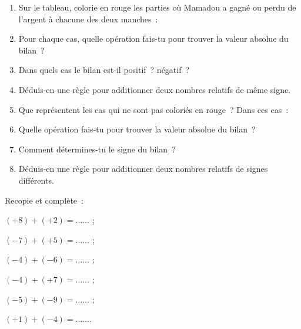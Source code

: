 \begin{activite}
\begin{partie}
\begin{enumerate}
 \item Sur le tableau, colorie en rouge les parties où Mamadou a gagné ou perdu de l'argent à chacune des deux manches :
 \item Pour chaque cas, quelle opération fais-tu pour trouver la valeur absolue du bilan ? 
 \item Dans quels cas le bilan est-il positif ? négatif ?
 \item Déduis-en une règle pour additionner deux nombres relatifs de même signe.
 \item Que représentent les cas qui ne sont pas coloriés en rouge ? Dans ces cas :
 \item Quelle opération fais-tu pour trouver la valeur absolue du bilan ? 
 \item Comment détermines-tu le signe du bilan ? 
 \item Déduis-en une règle pour additionner deux nombres relatifs de signes différents. 
 \end{enumerate}
\end{partie}

\begin{partie}
Recopie et complète :
\begin{colenumerate}{3}
 \item $(+8) + (+2) = \ldots \dots$ ;
 \item $(-7) + (+5) = \ldots \dots$ ;
 \item $(-4) + (-6) = \ldots \dots$ ;
 \item $(-4) + (+7) = \ldots \dots$ ;
 \item $(-5) + (-9) = \ldots \dots$ ;
 \item $(+1) + (-4) = \ldots \dots$.
 \end{colenumerate}
\end{partie}

\end{activite}


